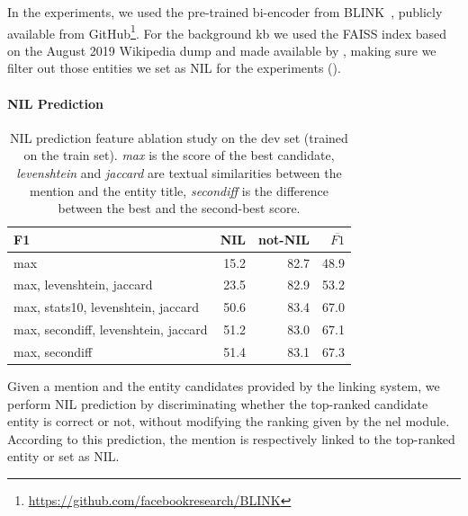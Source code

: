 In the experiments, we used the pre-trained bi-encoder from BLINK~\cite{blink}, publicly available from GitHub\footnote{\url{https://github.com/facebookresearch/BLINK}}.
For the background \ac{kb} we used the FAISS \cite{faiss} index based on the August 2019 Wikipedia dump and made available by \textcite{blink}, making sure we filter out those entities we set as NIL for the experiments ().



\paragraph{NIL Prediction}

\begin{table}
    \centering
\begin{tabular}{lrrr}
\toprule
F1 &  NIL &  not-NIL &  $\overline{F1}$  \\

\midrule
max                               &  15.2 &  82.7 &          48.9 \\
max, levenshtein, jaccard           &  23.5 &  82.9 &          53.2 \\
max, stats10, levenshtein, jaccard   &  50.6 &  83.4 &          67.0 \\
max, secondiff, levenshtein, jaccard &  51.2 &  83.0 &          67.1 \\
max, secondiff                     &  51.4 &  83.1 &          67.3 \\
\bottomrule
\end{tabular}
    \caption{NIL prediction feature ablation study on the dev set (trained on the train set). \textit{max} is the score of the best candidate, \textit{levenshtein} and \textit{jaccard} are textual similarities between the mention and the entity title, \textit{secondiff} is the difference between the best and the second-best score.}
    \label{tab:feature_ablation_study}
\end{table}


Given a mention and the entity candidates provided by the linking system, we perform NIL prediction by discriminating whether the top-ranked candidate entity is correct or not, without modifying the ranking given by the \ac{nel} module. According to this prediction, the mention is respectively linked to the top-ranked entity or set as NIL.

